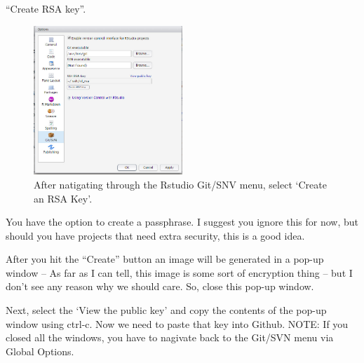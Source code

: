 \documentclass[12pt]{../SOP4_alpha}\usepackage[]{graphicx}\usepackage[]{color}
\begin{document}
\NP ``Create RSA key''. 

\begin{figure}
\centering
\includegraphics[width=0.5\textwidth]{graphics/CreatingSSH.jpg}
\caption{After natigating through the Rstudio Git/SNV menu, select `Create an RSA Key'.}
\end{figure}

\NP You have the option to create a passphrase. I suggest you ignore this for now, but should you have projects that need extra security, this is a good idea.

\NP After you hit the ``Create'' button an image will be generated in a pop-up window -- As far as I can tell, this image is some sort of encryption thing -- but I don't see any reason why we should care. So, close this pop-up window. 

\NP Next, select the `View the public key' and copy the contents of the pop-up window using ctrl-c. Now we need to paste that key into Github. NOTE: If you closed all the windows, you have to nagivate back to the Git/SVN menu via Global Options. 
\end{document}
